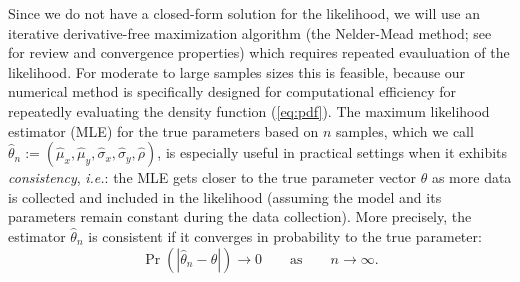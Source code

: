 Since we do not have a closed-form solution for the likelihood, we
will use an iterative derivative-free maximization algorithm (the
Nelder-Mead method; see \cite{lagarias1998convergence} for review and
convergence properties) which requires repeated evauluation of the
likelihood. For moderate to large samples sizes this is feasible,
because our numerical method is specifically designed for
computational efficiency for repeatedly evaluating the density
function (\ref{eq:pdf}). The maximum likelihood estimator (MLE) for
the true parameters based on $n$ samples, which we call
$\hat{\theta}_n := (\hat{\mu}_x, \hat{\mu}_y, \hat{\sigma}_x,
\hat{\sigma}_y, \hat{\rho})$, is especially useful in practical
settings when it exhibits \textit{consistency}, \textit{i.e.}: the MLE
gets closer to the true parameter vector $\theta$ as more data is
collected and included in the likelihood (assuming the model and its
parameters remain constant during the data collection). More
precisely, the estimator $\hat{\theta}_n$ is consistent if it
converges in probability to the true parameter:
\[
  \Pr( | \hat{\theta}_n - \theta | ) \to 0 \qquad \mbox{as} \qquad n \to \infty.
\]


